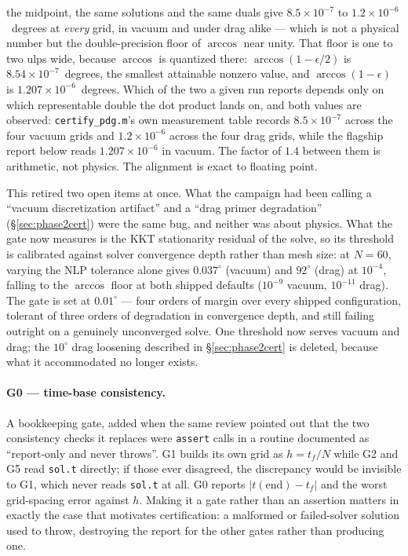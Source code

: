 \documentclass[11pt]{article}
\begin{document}
the midpoint, the same solutions and the same duals give
$8.5\times10^{-7}$ to $1.2\times10^{-6}$~degrees at \emph{every} grid, in
vacuum and under drag alike --- which is not a physical number but the
double-precision floor of $\arccos$ near unity. That floor is one to two
ulps wide, because $\arccos$ is quantized there: $\arccos(1-\epsilon/2)$ is
$8.54\times10^{-7}$~degrees, the smallest attainable nonzero value, and
$\arccos(1-\epsilon)$ is $1.207\times10^{-6}$~degrees. Which of the two a
given run reports depends only on which representable double the dot
product lands on, and both values are observed: \texttt{certify\_pdg.m}'s
own measurement table records $8.5\times10^{-7}$ across the four vacuum
grids and $1.2\times10^{-6}$ across the four drag grids, while the
flagship report below reads $1.207\times10^{-6}$ in vacuum. The factor of
$1.4$ between them is arithmetic, not physics. The alignment is exact to
floating point.

This retired two open items at once. What the campaign had been calling a
``vacuum discretization artifact'' and a ``drag primer degradation''
(\S\ref{sec:phase2cert}) were the same bug, and neither was about physics.
What the gate now measures is the KKT stationarity residual of the solve,
so its threshold is calibrated against solver convergence depth rather than
mesh size: at $N=60$, varying the NLP tolerance alone gives $0.037^\circ$
(vacuum) and $92^\circ$ (drag) at $10^{-4}$, falling to the $\arccos$ floor
at both shipped defaults ($10^{-9}$ vacuum, $10^{-11}$ drag). The gate is
set at $0.01^\circ$ --- four orders of margin over every shipped
configuration, tolerant of three orders of degradation in convergence
depth, and still failing outright on a genuinely unconverged solve. One
threshold now serves vacuum and drag; the $10^\circ$ drag loosening
described in \S\ref{sec:phase2cert} is deleted, because what it
accommodated no longer exists.

\paragraph{G0 --- time-base consistency.}
A bookkeeping gate, added when the same review pointed out that the two
consistency checks it replaces were \texttt{assert} calls in a routine
documented as ``report-only and never throws''. G1 builds its own grid as
$h = t_f/N$ while G2 and G5 read \verb|sol.t| directly; if those ever
disagreed, the discrepancy would be invisible to G1, which never reads
\verb|sol.t| at all. G0 reports $|t(\mathrm{end}) - t_f|$ and the worst
grid-spacing error against $h$. Making it a gate rather than an assertion
matters in exactly the case that motivates certification: a malformed or
failed-solver solution used to throw, destroying the report for the other
gates rather than producing one.
\end{document}
